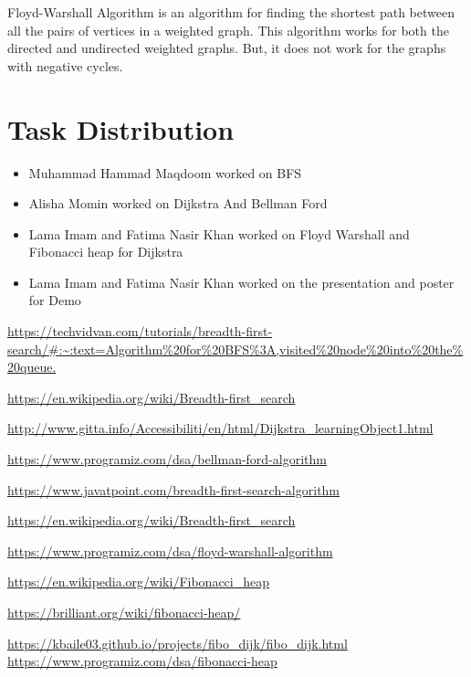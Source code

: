 \documentclass[a4paper, 12pt]{report}
\begin{document}
Floyd-Warshall Algorithm is an algorithm for finding the shortest path between all the pairs of vertices in a weighted graph. This algorithm works for both the directed and undirected weighted graphs. But, it does not work for the graphs with negative cycles.\\
    
    \chapter{Task Distribution}
    \begin{itemize}
        \item Muhammad Hammad Maqdoom worked on BFS\\
        \item Alisha Momin worked on Dijkstra And Bellman Ford\\
        \item Lama Imam and Fatima Nasir Khan worked on Floyd Warshall and Fibonacci heap for Dijkstra\\ 
        \item Lama Imam and Fatima Nasir Khan worked on the presentation and poster for Demo\\
    \end{itemize}
    
    \pagebreak
    \begin{thebibliography}{9}
    
    \url{https://techvidvan.com/tutorials/breadth-first-search/#:~:text=Algorithm\%20for\%20BFS\%3A,visited\%20node\%20into\%20the\%20queue.}
    
    \url{https://en.wikipedia.org/wiki/Breadth-first_search} 
    
    \url{http://www.gitta.info/Accessibiliti/en/html/Dijkstra_learningObject1.html}
    
    \url{https://www.programiz.com/dsa/bellman-ford-algorithm}
    
    \url{https://www.javatpoint.com/breadth-first-search-algorithm}
    
    \url{https://en.wikipedia.org/wiki/Breadth-first_search}
    
    \url{https://www.programiz.com/dsa/floyd-warshall-algorithm}
    
    \url{https://en.wikipedia.org/wiki/Fibonacci_heap}
    
    \url{https://brilliant.org/wiki/fibonacci-heap/}
    
    \url{https://kbaile03.github.io/projects/fibo_dijk/fibo_dijk.html}
    \url{https://www.programiz.com/dsa/fibonacci-heap}
    \end{thebibliography}
       
   
\end{document}
